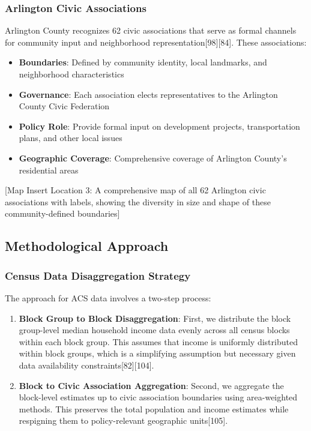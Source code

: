 \documentclass[
  letterpaper,
  DIV=11,
  numbers=noendperiod]{scrartcl}
\providecommand{\tightlist}{%
  \setlength{\itemsep}{0pt}\setlength{\parskip}{0pt}}
\begin{document}
\subsubsection{Arlington Civic
Associations}\label{arlington-civic-associations}

Arlington County recognizes 62 civic associations that serve as formal
channels for community input and neighborhood
representation{[}98{]}{[}84{]}. These associations:

\begin{itemize}
\tightlist
\item
  \textbf{Boundaries}: Defined by community identity, local landmarks,
  and neighborhood characteristics
\item
  \textbf{Governance}: Each association elects representatives to the
  Arlington County Civic Federation
\item
  \textbf{Policy Role}: Provide formal input on development projects,
  transportation plans, and other local issues
\item
  \textbf{Geographic Coverage}: Comprehensive coverage of Arlington
  County's residential areas
\end{itemize}

{[}Map Insert Location 3: A comprehensive map of all 62 Arlington civic
associations with labels, showing the diversity in size and shape of
these community-defined boundaries{]}

\subsection{Methodological Approach}\label{methodological-approach}

\subsubsection{Census Data Disaggregation
Strategy}\label{census-data-disaggregation-strategy}

The approach for ACS data involves a two-step process:

\begin{enumerate}
\def\labelenumi{\arabic{enumi}.}
\item
  \textbf{Block Group to Block Disaggregation}: First, we distribute the
  block group-level median household income data evenly across all
  census blocks within each block group. This assumes that income is
  uniformly distributed within block groups, which is a simplifying
  assumption but necessary given data availability
  constraints{[}82{]}{[}104{]}.
\item
  \textbf{Block to Civic Association Aggregation}: Second, we aggregate
  the block-level estimates up to civic association boundaries using
  area-weighted methods. This preserves the total population and income
  estimates while respigning them to policy-relevant geographic
  units{[}105{]}.
\end{enumerate}
\end{document}
